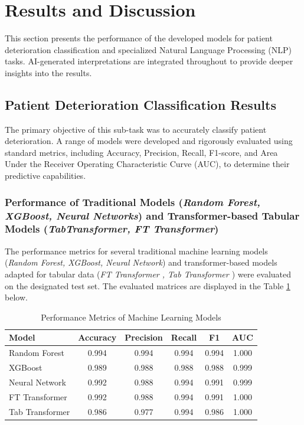 \section{Results and Discussion}

This section presents the performance of the developed models for patient deterioration classification and specialized Natural Language Processing (NLP) tasks. AI-generated interpretations are integrated throughout to provide deeper insights into the results.

\subsection{Patient Deterioration Classification Results}

The primary objective of this sub-task was to accurately classify patient deterioration. A range of models were developed and rigorously evaluated using standard metrics, including Accuracy, Precision, Recall, F1-score, and Area Under the Receiver Operating Characteristic Curve (AUC), to determine their predictive capabilities.

\subsubsection{Performance of Traditional Models (\textit{Random Forest, XGBoost, Neural Networks}) and Transformer-based Tabular Models (\textit{TabTransformer, FT Transformer})}

The performance metrics for several traditional machine learning models (\textit{Random Forest, XGBoost, Neural Network}) and transformer-based models adapted for tabular data (\textit{FT Transformer \parencite{gorishniy2023revisitingdeeplearningmodels}, Tab Transformer \parencite{huang2020tabtransformertabulardatamodeling}}) were evaluated on the designated test set. The evaluated matrices are displayed in the Table \ref{tab:ml_model_performance}  below.

\begin{table}[htbp]
    \centering
    \caption{Performance Metrics of Machine Learning Models}
    \label{tab:ml_model_performance}
    \begin{tabular}{lccccc}
        \hline
        \textbf{Model} & \textbf{Accuracy} & \textbf{Precision} & \textbf{Recall} & \textbf{F1} & \textbf{AUC} \\
        \hline
        Random Forest & 0.994 & 0.994 & 0.994 & 0.994 & 1.000 \\
        XGBoost & 0.989 & 0.988 & 0.988 & 0.988 & 0.999 \\
        Neural Network & 0.992 & 0.988 & 0.994 & 0.991 & 0.999 \\
        FT Transformer & 0.992 & 0.988 & 0.994 & 0.991 & 1.000 \\
        Tab Transformer & 0.986 & 0.977 & 0.994 & 0.986 & 1.000 \\
        \hline
    \end{tabular}
\end{table}

